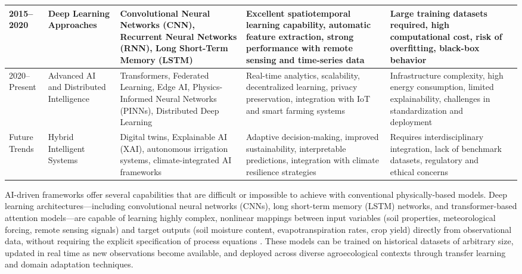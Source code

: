 \documentclass[land,article,submit,pdftex,moreauthors]{Definitions/mdpi}
\numberwithin{equation}{section}
\begin{document}
\begin{longtable}{p{1.4cm} p{1.6cm} p{2.2cm} p{2.9cm} p{2.9cm} p{1.5cm}}
2015--2020 &
Deep Learning Approaches &
Convolutional Neural Networks (CNN), Recurrent Neural Networks (RNN), Long Short-Term Memory (LSTM) &
Excellent spatiotemporal learning capability, automatic feature extraction, strong performance with remote sensing and time-series data &
Large training datasets required, high computational cost, risk of overfitting, black-box behavior &
\citep{Kratzert2018, Reichstein2019, Shen2018} \\ \hline

2020--Present &
Advanced AI and Distributed Intelligence &
Transformers, Federated Learning, Edge AI, Physics-Informed Neural Networks (PINNs), Distributed Deep Learning &
Real-time analytics, scalability, decentralized learning, privacy preservation, integration with IoT and smart farming systems &
Infrastructure complexity, high energy consumption, limited explainability, challenges in standardization and deployment &
\citep{Karniadakis2021, Vaswani2017, Barthwal2025, Martinez2025} \\ \hline

Future Trends &
Hybrid Intelligent Systems &
Digital twins, Explainable AI (XAI), autonomous irrigation systems, climate-integrated AI frameworks &
Adaptive decision-making, improved sustainability, interpretable predictions, integration with climate resilience strategies &
Requires interdisciplinary integration, lack of benchmark datasets, regulatory and ethical concerns &
\citep{Pylianidis2021, Verdouw2021, Arrieta2020, Sit2020} \\

\end{longtable}
\normalsize

AI-driven frameworks offer several capabilities that are difficult or impossible to achieve with conventional physically-based models. Deep learning architectures---including convolutional neural networks (CNNs), long short-term memory (LSTM) networks, and transformer-based attention models---are capable of learning highly complex, nonlinear mappings between input variables (soil properties, meteorological forcing, remote sensing signals) and target outputs (soil moisture content, evapotranspiration rates, crop yield) directly from observational data, without requiring the explicit specification of process equations \citep{lecun2015deep}. These models can be trained on historical datasets of arbitrary size, updated in real time as new observations become available, and deployed across diverse agroecological contexts through transfer learning and domain adaptation techniques.
\end{document}
